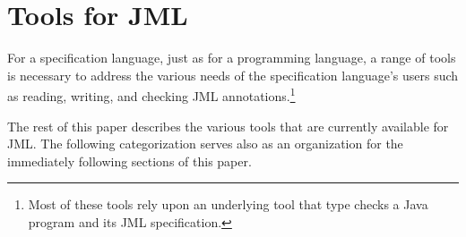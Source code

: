\section{Tools for JML}
\label{tools}

For a specification language, just as for a programming language, a
range of tools is necessary to address the various needs of the
specification language's users such as reading, writing, and checking
JML annotations.\footnote{Most of these tools rely upon an underlying
  tool that type checks a Java program and its JML specification.}



The rest of this paper describes the various tools that are currently
available for JML.  The following categorization serves also as an
organization for the immediately following sections of this paper.

\smallskip

